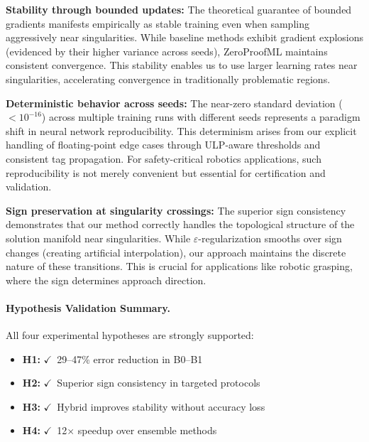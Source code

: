 \documentclass[twoside,11pt]{article}
\begin{document}
\textbf{Stability through bounded updates:} The theoretical guarantee of bounded gradients manifests empirically as stable training even when sampling aggressively near singularities. While baseline methods exhibit gradient explosions (evidenced by their higher variance across seeds), ZeroProofML maintains consistent convergence. This stability enables us to use larger learning rates near singularities, accelerating convergence in traditionally problematic regions.

\textbf{Deterministic behavior across seeds:} The near-zero standard deviation ($<10^{-16}$) across multiple training runs with different seeds represents a paradigm shift in neural network reproducibility. This determinism arises from our explicit handling of floating-point edge cases through ULP-aware thresholds and consistent tag propagation. For safety-critical robotics applications, such reproducibility is not merely convenient but essential for certification and validation.

\textbf{Sign preservation at singularity crossings:} The superior sign consistency demonstrates that our method correctly handles the topological structure of the solution manifold near singularities. While $\varepsilon$-regularization smooths over sign changes (creating artificial interpolation), our approach maintains the discrete nature of these transitions. This is crucial for applications like robotic grasping, where the sign determines approach direction.

\paragraph{Hypothesis Validation Summary.}
All four experimental hypotheses are strongly supported:
\begin{itemize}
\item \textbf{H1:} $\checkmark$~29--47\% error reduction in B0--B1
\item \textbf{H2:} $\checkmark$~Superior sign consistency in targeted protocols
\item \textbf{H3:} $\checkmark$~Hybrid improves stability without accuracy loss
\item \textbf{H4:} $\checkmark$~12$\times$ speedup over ensemble methods
\end{itemize}



\end{document}

